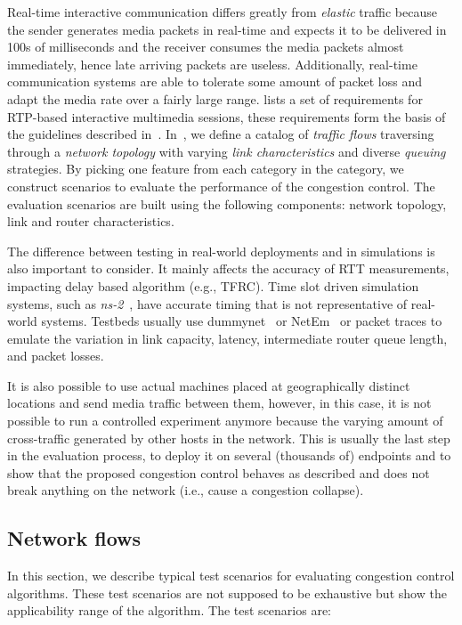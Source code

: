 Real-time interactive communication differs greatly from \emph{elastic}
traffic because the sender generates media packets in real-time and expects it
to be delivered in 100s of milliseconds and the receiver consumes the media
packets almost immediately, hence late arriving packets are useless.
Additionally, real-time communication systems are able to tolerate some amount
of packet loss and adapt the media rate over a fairly large range.
\cite{draft.rmcat.req} lists a set of requirements for RTP-based interactive
multimedia sessions, these requirements form the basis of the guidelines
described in~\cite{draft.rmcat.evaluate}. In~\cite{draft.rmcat.eval.test}, we
define a catalog of \emph{traffic flows} traversing through a \emph{network
topology} with varying \emph{link characteristics} and diverse \emph{queuing}
strategies. By picking one feature from each category in the category, we
construct scenarios to evaluate the performance of the congestion control. The
evaluation scenarios are built using the following components: network
topology, link and router characteristics.

The difference between testing in real-world deployments and in simulations is
also important to consider. It mainly affects the accuracy of RTT
measurements, impacting delay based algorithm (e.g., TFRC). Time slot driven
simulation systems, such as \emph{ns-2}~\cite{ns2}, have accurate timing that
is not representative of real-world systems. Testbeds usually use
dummynet~\cite{Carbone:2010p3502} or NetEm~\cite{netem} or packet traces to
emulate the variation in link capacity, latency, intermediate router queue
length, and packet losses. 

It is also possible to use actual machines placed at geographically distinct
locations and send media traffic between them, however, in this case, it is
not possible to run a controlled experiment anymore because the varying amount
of cross-traffic generated by other hosts in the network. This is usually the
last step in the evaluation process, to deploy it on several (thousands of)
endpoints and to show that the proposed congestion control behaves as
described and does not break anything on the network (i.e., cause a congestion
collapse).

\subsection{Network flows}

In this section, we describe typical test scenarios for evaluating congestion
control algorithms. These test scenarios are not supposed to be exhaustive
but show the applicability range of the algorithm. The test scenarios are:

